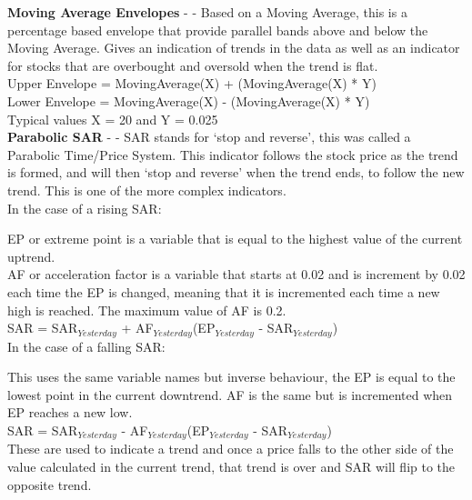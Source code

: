 \documentclass[conference]{IEEEtran}
\begin{document}
\noindent
\textbf{Moving Average Envelopes} - \cite{Murphy1999} - Based on a Moving Average, this is a percentage based envelope that provide parallel bands above and below the Moving Average. Gives an indication of trends in the data as well as an indicator for stocks that are overbought and oversold when the trend is flat.\\

\noindent
Upper Envelope = MovingAverage(X) + (MovingAverage(X) * Y)\\
Lower Envelope = MovingAverage(X) - (MovingAverage(X) * Y)\\
Typical values X = 20 and Y = 0.025\\

\noindent
\textbf{Parabolic SAR} - \cite{Wilder1978} - SAR stands for `stop and reverse', this was called a Parabolic Time/Price System. This indicator follows the stock price as the trend is formed, and will then `stop and reverse' when the trend ends, to follow the new trend. This is one of the more complex indicators.\\

\noindent
In the case of a rising SAR:

\noindent
EP or extreme point is a variable that is equal to the highest value of the current uptrend.\\
AF or acceleration factor is a variable that starts at 0.02 and is increment by 0.02 each time the EP is changed, meaning that it is incremented each time a new high is reached. The maximum value of AF is 0.2. \\

\noindent
SAR = SAR$_{Yesterday}$ + AF$_{Yesterday}$(EP$_{Yesterday}$ - SAR$_{Yesterday}$) \\

\noindent
In the case of a falling SAR:

\noindent
This uses the same variable names but inverse behaviour, the EP is equal to the lowest point in the current downtrend. AF is the same but is incremented when EP reaches a new low. \\

\noindent
SAR = SAR$_{Yesterday}$ - AF$_{Yesterday}$(EP$_{Yesterday}$ - SAR$_{Yesterday}$) \\

\noindent
These are used to indicate a trend and once a price falls to the other side of the value calculated in the current trend, that trend is over and SAR will flip to the opposite trend. \\
\end{document}
